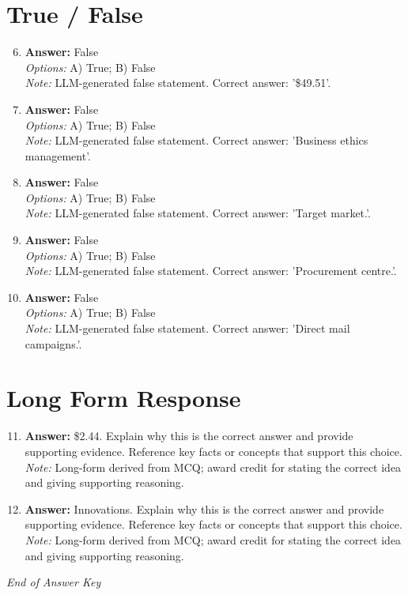 \documentclass[12pt]{article}
\begin{document}
\section*{True / False}
\begin{enumerate}[label=\arabic*.]
\setcounter{enumi}{5}
\item \textbf{Answer:} False
\\ \textit{Options:} A) True; B) False
\\ \textit{Note:} LLM-generated false statement. Correct answer: '\$49.51'.
\item \textbf{Answer:} False
\\ \textit{Options:} A) True; B) False
\\ \textit{Note:} LLM-generated false statement. Correct answer: 'Business ethics management'.
\item \textbf{Answer:} False
\\ \textit{Options:} A) True; B) False
\\ \textit{Note:} LLM-generated false statement. Correct answer: 'Target market.'.
\item \textbf{Answer:} False
\\ \textit{Options:} A) True; B) False
\\ \textit{Note:} LLM-generated false statement. Correct answer: 'Procurement centre.'.
\item \textbf{Answer:} False
\\ \textit{Options:} A) True; B) False
\\ \textit{Note:} LLM-generated false statement. Correct answer: 'Direct mail campaigns.'.
\end{enumerate}

\section*{Long Form Response}
\begin{enumerate}[label=\arabic*.]
\setcounter{enumi}{10}
\item \textbf{Answer:} \$2.44. Explain why this is the correct answer and provide supporting evidence. Reference key facts or concepts that support this choice.
\\ \textit{Note:} Long-form derived from MCQ; award credit for stating the correct idea and giving supporting reasoning.
\item \textbf{Answer:} Innovations. Explain why this is the correct answer and provide supporting evidence. Reference key facts or concepts that support this choice.
\\ \textit{Note:} Long-form derived from MCQ; award credit for stating the correct idea and giving supporting reasoning.
\end{enumerate}

\vfill
\noindent\textit{End of Answer Key}
\end{document}
